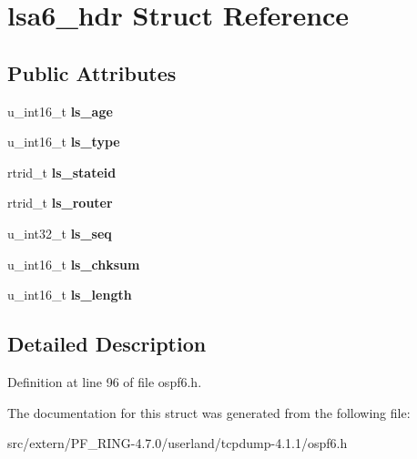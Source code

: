 \hypertarget{structlsa6__hdr}{
\section{lsa6\_\-hdr Struct Reference}
\label{structlsa6__hdr}
}
\subsection*{Public Attributes}
\begin{DoxyCompactItemize}
\item 
\hypertarget{structlsa6__hdr_a6e777e12bd1d82ef0229a9efb5924b48}{
u\_\-int16\_\-t {\bfseries ls\_\-age}}
\label{structlsa6__hdr_a6e777e12bd1d82ef0229a9efb5924b48}

\item 
\hypertarget{structlsa6__hdr_a59c3b874f1d4885ff96d59f06a0aa4c5}{
u\_\-int16\_\-t {\bfseries ls\_\-type}}
\label{structlsa6__hdr_a59c3b874f1d4885ff96d59f06a0aa4c5}

\item 
\hypertarget{structlsa6__hdr_ae0a3a5afc3aeaa8efba56e78943e3d8d}{
rtrid\_\-t {\bfseries ls\_\-stateid}}
\label{structlsa6__hdr_ae0a3a5afc3aeaa8efba56e78943e3d8d}

\item 
\hypertarget{structlsa6__hdr_aff118c5b3df2387c26a3151cbddf45ae}{
rtrid\_\-t {\bfseries ls\_\-router}}
\label{structlsa6__hdr_aff118c5b3df2387c26a3151cbddf45ae}

\item 
\hypertarget{structlsa6__hdr_aea15b9cd3dad318148773e5d372fc9a8}{
u\_\-int32\_\-t {\bfseries ls\_\-seq}}
\label{structlsa6__hdr_aea15b9cd3dad318148773e5d372fc9a8}

\item 
\hypertarget{structlsa6__hdr_a4e7d2b9da94d26632ad7a56b0f667d9f}{
u\_\-int16\_\-t {\bfseries ls\_\-chksum}}
\label{structlsa6__hdr_a4e7d2b9da94d26632ad7a56b0f667d9f}

\item 
\hypertarget{structlsa6__hdr_ac4d402038538cf1830333013096b5120}{
u\_\-int16\_\-t {\bfseries ls\_\-length}}
\label{structlsa6__hdr_ac4d402038538cf1830333013096b5120}

\end{DoxyCompactItemize}


\subsection{Detailed Description}


Definition at line 96 of file ospf6.h.



The documentation for this struct was generated from the following file:\begin{DoxyCompactItemize}
\item 
src/extern/PF\_\-RING-\/4.7.0/userland/tcpdump-\/4.1.1/ospf6.h\end{DoxyCompactItemize}
